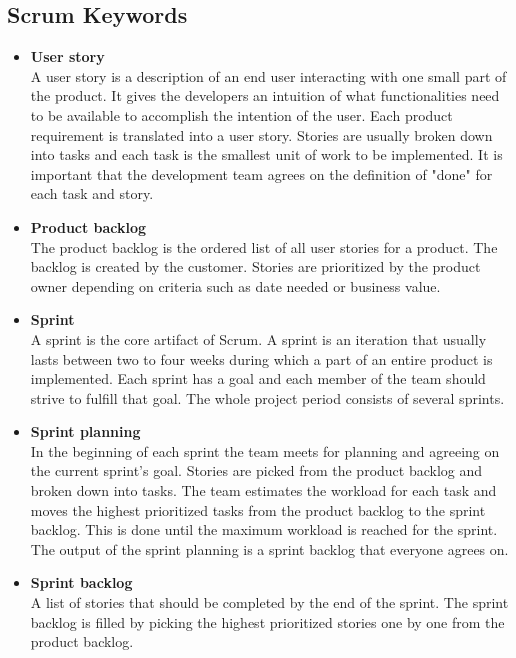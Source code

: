 \subsection{Scrum Keywords}
\begin{itemize}
\item{\textbf{User story}}\\
A user story is a description of an end user interacting with one small part
of the product. It gives the developers an intuition of what functionalities need to be available
to accomplish the intention of the user.
Each product requirement is translated into a user story. Stories are usually
broken down into tasks and each task is the smallest unit of work to be implemented.
It is important that the development team agrees on the definition of "done" for each task and story.

\item{\textbf{Product backlog}}\\
The product backlog is the ordered list of all user stories for a product. The backlog
is created by the customer.
Stories are prioritized by the product owner depending on criteria such as date needed or business value.

\item{\textbf{Sprint}}\\
A sprint is the core artifact of Scrum. A sprint is an iteration that usually lasts between two to four weeks
during which a part of an entire product is implemented. Each sprint has a goal and each member of
the team should strive to fulfill that goal. The whole project period consists of several sprints.

\item{\textbf{Sprint planning}}\\
In the beginning of each sprint the team meets for planning and agreeing on the current sprint's goal.
Stories are picked from the product backlog and broken down into tasks. The team estimates the workload
for each task and moves the highest prioritized tasks from the product backlog to the
sprint backlog. This is done until the maximum workload is reached for the sprint. The output of the sprint planning
is a sprint backlog that everyone agrees on. 

\item{\textbf{Sprint backlog}}\\
A list of stories that should be completed by the end of the sprint. The sprint backlog is filled by picking the highest 
prioritized stories one by one from the product backlog. 


\end{itemize}
